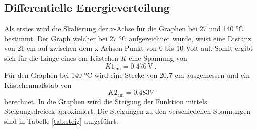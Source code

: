 \subsection{Differentielle Energieverteilung}
Als erstes wird die Skalierung der x-Achse für die Graphen bei 27 und 140 °C bestimmt. Der Graph welcher bei 27 °C aufgezeichnet wurde, weist eine Distanz von 21 cm auf zwischen dem x-Achsen Punkt von 0 bis 10 Volt auf. Somit ergibt sich für die Länge eines cm Kästchen $K$ eine Spannung von
\begin{equation}
  K1_\text{cm} = 0.476 \, \text{V} \ .
  \label{eqn:K1}
\end{equation}
Für den Graphen bei 140 °C wird eine Stecke von 20.7 cm ausgemessen und ein Kästchenmaßstab von
\begin{equation}
  K2_\text{cm} = 0.483 V
  \label{eqn:K2}
\end{equation}
berechnet.
In die Graphen wird die Steigung der Funktion mittels Steigungsdreieck aproximiert. Die Steigungen zu den verschiedenen Spannungen sind in Tabelle \ref{tab:steig} aufgeführt.
